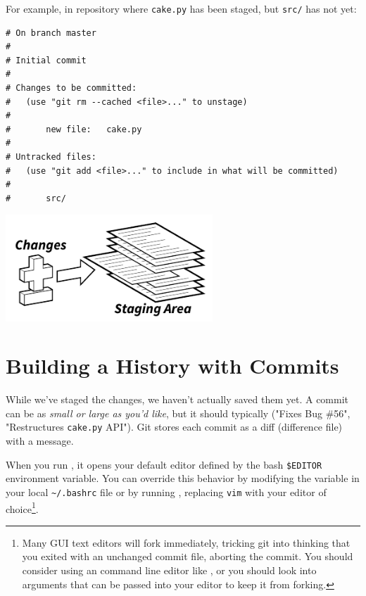 \documentclass[11pt,letterpaper,twoside]{report}
\begin{document}
For example, in repository where \texttt{cake.py} has been staged, but
\texttt{src/} has not yet:

\begin{lstlisting}[numbers=none]
# On branch master
#
# Initial commit
#
# Changes to be committed:
#   (use "git rm --cached <file>..." to unstage)
#
#       new file:   cake.py
#
# Untracked files:
#   (use "git add <file>..." to include in what will be committed)
#
#       src/
\end{lstlisting}

\vspace{\fill}
\begin{flushright}
\includegraphics[height=4cm]{resources/staging_abstract.pdf}

\end{flushright}
\vspace*{\fill}

\chapter{Building a History with Commits}

While we've staged the changes, we haven't actually saved them yet. A commit can
be as \emph{small or large as you'd like}, but it should typically
 ("Fixes Bug \#56", "Restructures
\texttt{cake.py} API"). Git stores each commit as a diff (difference file) with
a message.

When you run , it opens your default editor defined by the
bash \texttt{\$EDITOR} environment variable. You can override this behavior by
modifying the variable in your local \texttt{\textasciitilde/.bashrc} file or by
running , replacing \texttt{vim}
with your editor of choice\footnote{Many GUI text editors will fork immediately,
tricking git into thinking that you exited with an unchanged commit file,
aborting the commit. You should consider using an command line editor like
, or you should look into arguments that can be passed into your
editor to keep it from forking.}.
\end{document}
